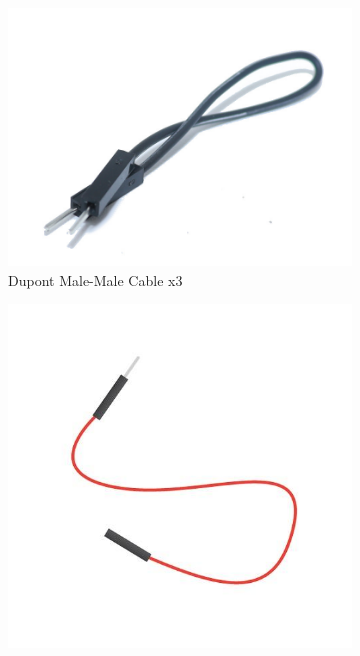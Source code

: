 \documentclass{article}
\begin{document}
\begin{figure}[H]
	\centering
	\begin{subfigure}[b]{0.3\textwidth}
		\includegraphics[width=\textwidth]{../images/cable_mm.jpg}
		\caption*{Dupont Male-Male Cable x3}
		\label{fig:cable mm}
	\end{subfigure}
	\hfill
	\begin{subfigure}[b]{0.3\textwidth}
		\includegraphics[width=\textwidth]{../images/cable_mh.jpg}

\end{subfigure}
\end{figure}
\end{document}
